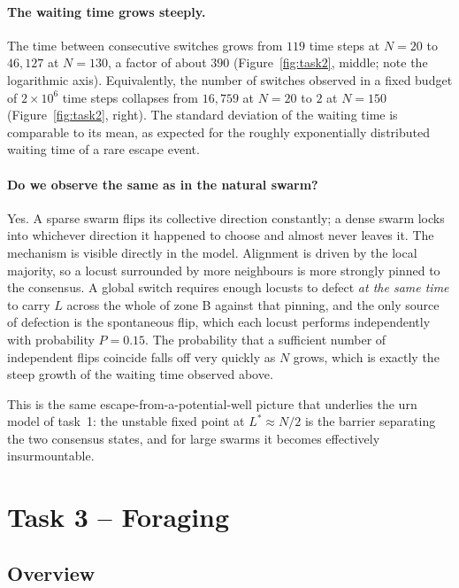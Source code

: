 \documentclass[12pt, a4paper]{article}
\begin{document}
\paragraph{The waiting time grows steeply.}
The time between consecutive switches grows from $119$ time steps at $N = 20$ to
$46{,}127$ at $N = 130$, a factor of about $390$ (Figure~\ref{fig:task2},
middle; note the logarithmic axis).  Equivalently, the number of switches
observed in a fixed budget of $2 \times 10^6$ time steps collapses from
$16{,}759$ at $N = 20$ to $2$ at $N = 150$ (Figure~\ref{fig:task2}, right).  The
standard deviation of the waiting time is comparable to its mean, as expected
for the roughly exponentially distributed waiting time of a rare escape event.

\paragraph{Do we observe the same as in the natural swarm?}
Yes.  A sparse swarm flips its collective direction constantly; a dense swarm
locks into whichever direction it happened to choose and almost never leaves it.
The mechanism is visible directly in the model.  Alignment is driven by the
local majority, so a locust surrounded by more neighbours is more strongly
pinned to the consensus.  A global switch requires enough locusts to defect
\emph{at the same time} to carry $L$ across the whole of zone B against that
pinning, and the only source of defection is the spontaneous flip, which each
locust performs independently with probability $P = 0.15$.  The probability that
a sufficient number of independent flips coincide falls off very quickly as $N$
grows, which is exactly the steep growth of the waiting time observed above.

This is the same escape-from-a-potential-well picture that underlies the urn
model of task~1: the unstable fixed point at $L^* \approx N/2$ is the barrier
separating the two consensus states, and for large swarms it becomes effectively
insurmountable.

\newpage
\section{Task 3 -- Foraging}

\subsection{Overview}
\end{document}
